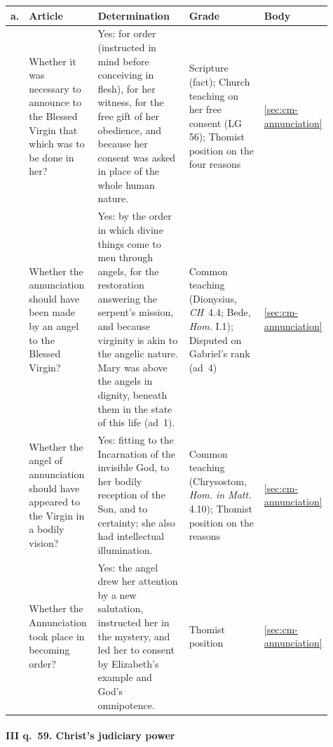 \begingroup\footnotesize
\begin{longtable}{>{\raggedright\arraybackslash}p{0.03\linewidth}>{\raggedright\arraybackslash}p{0.22\linewidth}>{\raggedright\arraybackslash}p{0.33\linewidth}>{\raggedright\arraybackslash}p{0.27\linewidth}>{\raggedright\arraybackslash}p{0.06\linewidth}}
\toprule
\textbf{a.} & \textbf{Article} & \textbf{Determination} & \textbf{Grade} & \textbf{Body}\\
\midrule
\endhead
1 & Whether it was necessary to announce to the Blessed Virgin that which was to be done in her? & Yes: for order (instructed in mind before conceiving in flesh), for her witness, for the free gift of her obedience, and because her consent was asked in place of the whole human nature. & Scripture (fact); Church teaching on her free consent (LG 56); Thomist position on the four reasons & \ref{sec:cm-annunciation}\\
2 & Whether the annunciation should have been made by an angel to the Blessed Virgin? & Yes: by the order in which divine things come to men through angels, for the restoration answering the serpent's mission, and because virginity is akin to the angelic nature. Mary was above the angels in dignity, beneath them in the state of this life (ad~1). & Common teaching (Dionysius, \emph{CH}~4.4; Bede, \emph{Hom.} I.1); Disputed on Gabriel's rank (ad~4) & \ref{sec:cm-annunciation}\\
3 & Whether the angel of annunciation should have appeared to the Virgin in a bodily vision? & Yes: fitting to the Incarnation of the invisible God, to her bodily reception of the Son, and to certainty; she also had intellectual illumination. & Common teaching (Chrysostom, \emph{Hom. in Matt.} 4.10); Thomist position on the reasons & \ref{sec:cm-annunciation}\\
4 & Whether the Annunciation took place in becoming order? & Yes: the angel drew her attention by a new salutation, instructed her in the mystery, and led her to consent by Elizabeth's example and God's omnipotence. & Thomist position & \ref{sec:cm-annunciation}\\
\bottomrule
\end{longtable}
\endgroup

\paragraph{III q.~59. Christ's judiciary power}

